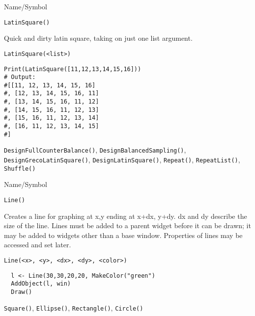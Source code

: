 \begin{desc}{Name/Symbol}
\item[Name/Symbol]	\verb+LatinSquare()+

\item[Description]	Quick and dirty latin square, taking on just one
  list argument.

\item[Usage]
\begin{verbatim}
LatinSquare(<list>)
\end{verbatim}

\item[Example]
\begin{verbatim}
Print(LatinSquare([11,12,13,14,15,16]))
# Output:
#[[11, 12, 13, 14, 15, 16]
#, [12, 13, 14, 15, 16, 11]
#, [13, 14, 15, 16, 11, 12]
#, [14, 15, 16, 11, 12, 13]
#, [15, 16, 11, 12, 13, 14]
#, [16, 11, 12, 13, 14, 15]
#]

\end{verbatim}

\item[See Also] \verb+DesignFullCounterBalance()+,
  \verb+DesignBalancedSampling()+, \verb+DesignGrecoLatinSquare()+,
  \verb+DesignLatinSquare()+, \verb+Repeat()+, \verb+RepeatList()+,
  \verb+Shuffle()+

\end{desc}

\rl




\begin{desc}{Name/Symbol}
\item[Name/Symbol]	\verb+Line()+

\item[Description] Creates a line for graphing at x,y ending at x+dx,
  y+dy.  dx and dy describe the size of the line.  Lines must be added
  to a parent widget before it can be drawn; it may be added to
  widgets other than a base window. Properties of lines may be
  accessed and set later.

\item[Usage]
\begin{verbatim}
Line(<x>, <y>, <dx>, <dy>, <color>)
\end{verbatim}

\item[Example]	
\begin{verbatim}
  l <- Line(30,30,20,20, MakeColor("green")
  AddObject(l, win)
  Draw()

\end{verbatim}
\item[See Also]	\verb+Square()+, \verb+Ellipse()+, \verb+Rectangle()+, \verb+Circle()+
\end{desc}

